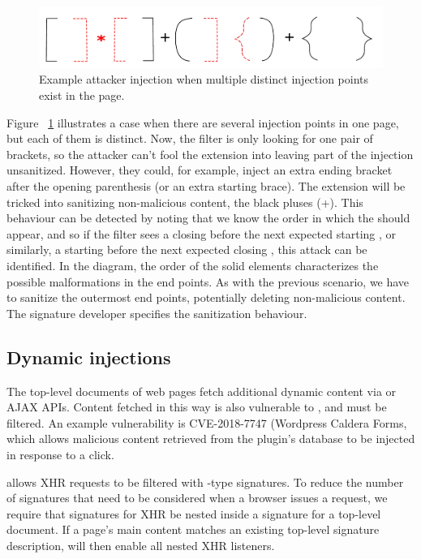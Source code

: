\begin{figure}[h]
	\includegraphics[scale=0.25]{img/attacker_injection_unique.pdf}
	\caption{Example attacker injection when multiple distinct injection points exist in the page.}
	\label{fig:attacker_injection_unique}
\end{figure}


Figure ~\ref{fig:attacker_injection_unique} illustrates a case when there are several injection points in one page, but each of them is distinct. Now, the filter is only looking for one pair of brackets, so the attacker can't fool the extension into leaving part of the injection unsanitized. However, they could, for example, inject an extra ending bracket after the opening parenthesis (or an extra starting brace). The extension will be tricked into sanitizing non-malicious content, the black pluses (+). This behaviour can be detected by noting that we know the order in which the  should appear, and so if the filter sees a closing  before the next expected starting , or similarly, a starting  before the next expected closing , this attack can be identified. In the diagram, the order of the solid elements characterizes the possible malformations in the end points. As with the previous scenario, we have to sanitize the outermost end points, potentially deleting non-malicious content. The signature developer specifies the sanitization behaviour.

\subsection{Dynamic injections} \label{dynamic_injections}

The top-level documents of web pages fetch additional dynamic content
via  or AJAX APIs. Content fetched in
this way is also vulnerable to \xss, and must be filtered. An example
vulnerability is CVE-2018-7747 (Wordpress Caldera Forms, which allows malicious
content retrieved from the plugin's database to be injected in response to a click.

\sys allows XHR requests to be filtered with -type
signatures. To reduce the number of signatures that need to be
considered when a browser issues a request, we require that signatures
for XHR be nested inside a signature for a top-level document. If a
page's main content matches an existing top-level signature description,
\sys will then enable all nested XHR listeners.

